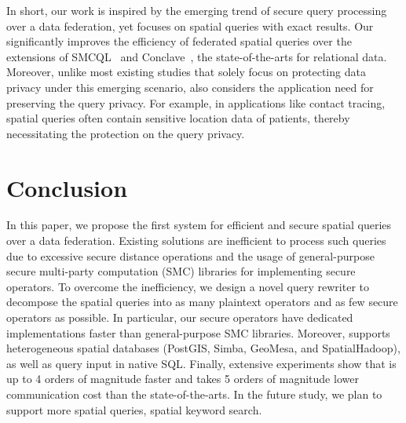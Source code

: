 In short, our work is inspired by the emerging trend of secure query processing over a data federation, yet focuses on spatial queries with exact results. 
Our \sysname significantly improves the efficiency of federated spatial queries over the extensions of SMCQL~\cite{vldb17smcql} and Conclave~\cite{eurosys19conclave}, the state-of-the-arts for relational data.
Moreover, unlike most existing studies that solely focus on protecting data privacy under this emerging scenario, \sysname also considers the application need for preserving the query privacy.
For example, in applications like contact tracing, spatial queries often contain sensitive location data of patients, thereby necessitating the protection on the query privacy.

\section{Conclusion}
\label{sec:conclusion}
In this paper, we propose the first system \sysname for efficient and secure spatial queries over a data federation.
Existing solutions are inefficient to process such queries due to excessive secure distance operations and the usage of general-purpose secure multi-party computation (SMC) libraries for implementing secure operators.
To overcome the inefficiency, we design a novel query rewriter to decompose the spatial queries into as many plaintext operators and as few secure operators as possible.
In particular, our secure operators have dedicated implementations faster than general-purpose SMC libraries.
Moreover, \sysname supports heterogeneous spatial databases (\eg PostGIS, Simba, GeoMesa, and SpatialHadoop), as well as query input in native SQL.
Finally, extensive experiments show that \sysname is up to 4 orders of magnitude faster and takes 5 orders of magnitude lower communication cost
than the state-of-the-arts.
In the future study, we plan to support more spatial queries, \eg spatial keyword search.


     


\clearpage




